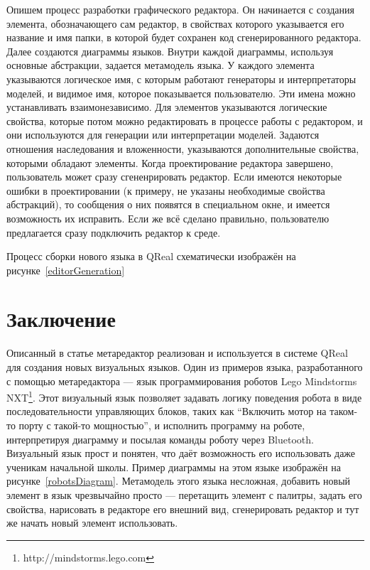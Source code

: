 \documentclass[a4paper]{article}
\begin{document}
Опишем процесс разработки графического редактора. Он начинается с создания элемента, обозначающего сам редактор, в свойствах которого указывается его название и имя папки, в которой будет сохранен код сгенерированного редактора. Далее создаются диаграммы языков. Внутри каждой диаграммы, используя основные абстракции, задается метамодель языка. У каждого элемента указываются логическое имя, с которым работают генераторы и интерпретаторы моделей, и видимое имя, которое показывается пользователю. Эти имена можно устанавливать взаимонезависимо. Для элементов указываются логические свойства, которые потом можно редактировать в процессе работы с редактором, и они используются для генерации или интерпретации моделей. Задаются отношения наследования и вложенности, указываются дополнительные свойства, которыми обладают элементы. Когда проектирование редактора завершено, пользователь может сразу сгененрировать редактор. Если имеются некоторые ошибки в проектировании (к примеру, не указаны необходимые свойства абстракций), то сообщения о них появятся в специальном окне, и имеется возможность их исправить. Если же всё сделано правильно, пользователю предлагается сразу подключить редактор к среде.  

Процесс сборки нового языка в QReal схематически изображён на рисунке~\ref{editorGeneration}

\section{Заключение}
Описанный в статье метаредактор реализован и используется в системе QReal для создания новых визуальных языков. Один из примеров языка, разработанного с помощью метаредактора --- язык программирования роботов Lego Mindstorms NXT\footnote{http://mindstorms.lego.com}. Этот визуальный язык позволяет задавать логику поведения робота в виде последовательности управляющих блоков, таких как ``Включить мотор на таком-то порту с такой-то мощностью'', и исполнить программу на роботе, интерпретируя диаграмму и посылая команды роботу через Bluetooth. Визуальный язык прост и понятен, что даёт возможность его использовать даже ученикам начальной школы. Пример диаграммы на этом языке изображён на рисунке~\ref{robotsDiagram}. Метамодель этого языка несложная, добавить новый элемент в язык чрезвычайно просто --- перетащить элемент с палитры, задать его свойства, нарисовать в редакторе его внешний вид, сгенерировать редактор и тут же начать новый элемент использовать.
\end{document}
